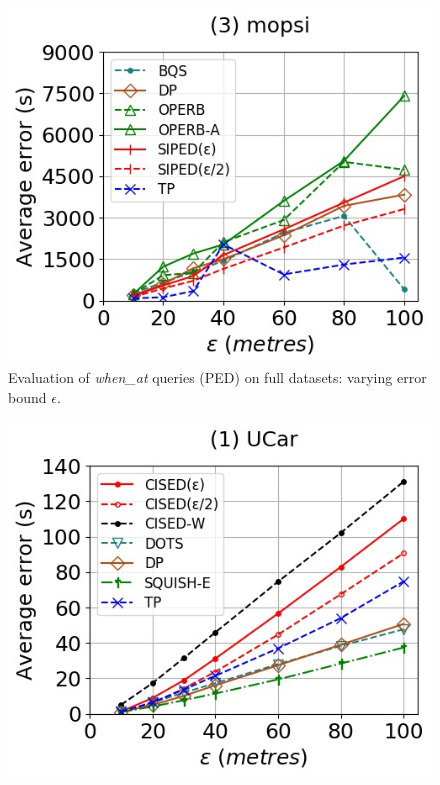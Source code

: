 {\begin{figure}[tb!]
	\includegraphics[scale = 0.350]{Figures/Exp-when-PED-error-epsilon-mopsi.jpg}
	\vspace{-2ex}
	\caption{\small {Evaluation of \emph{when\_at} queries (PED) on full datasets: varying error bound $\epsilon$.}}
	\label{fig:query-when-ped-epsilon}
	\vspace{-1.0ex}
\end{figure}
\begin{figure}[tb!]
	\centering
	\includegraphics[scale = 0.350]{Figures/Exp-when-SED-error-epsilon-service.jpg}\hspace{0.5ex}

\end{figure}}

